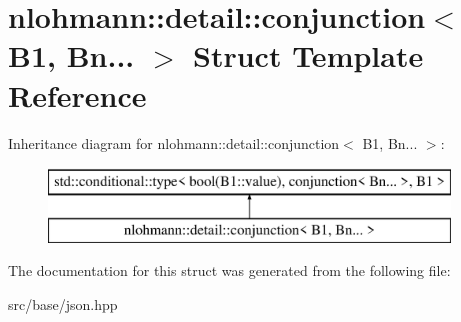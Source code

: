 \hypertarget{structnlohmann_1_1detail_1_1conjunction_3_01_b1_00_01_bn_8_8_8_01_4}{}\section{nlohmann\+:\+:detail\+:\+:conjunction$<$ B1, Bn... $>$ Struct Template Reference}
\label{structnlohmann_1_1detail_1_1conjunction_3_01_b1_00_01_bn_8_8_8_01_4}
Inheritance diagram for nlohmann\+:\+:detail\+:\+:conjunction$<$ B1, Bn... $>$\+:\begin{figure}[H]
\begin{center}
\leavevmode
\includegraphics[height=2.000000cm]{structnlohmann_1_1detail_1_1conjunction_3_01_b1_00_01_bn_8_8_8_01_4}
\end{center}
\end{figure}


The documentation for this struct was generated from the following file\+:\begin{DoxyCompactItemize}
\item 
src/base/json.\+hpp\end{DoxyCompactItemize}
